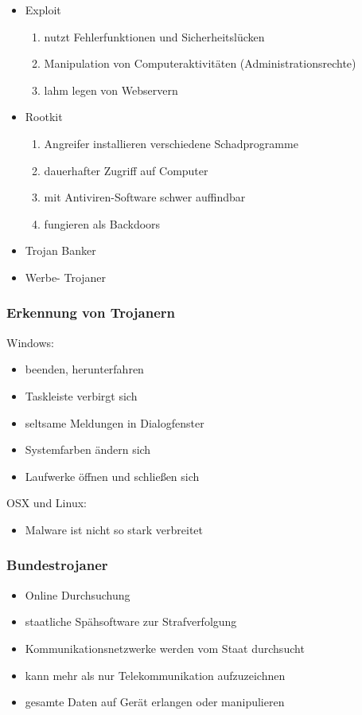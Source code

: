 \documentclass{beamer}
\begin{document}
\begin{frame}
	\begin{itemize}
		\item Exploit
			\begin{enumerate}
				\item nutzt Fehlerfunktionen und Sicherheitslücken
				\item Manipulation von Computeraktivitäten (Administrationsrechte)
				\item lahm legen von Webservern
			\end{enumerate}
		\item Rootkit
			\begin{enumerate}
				\item Angreifer installieren verschiedene Schadprogramme
				\item dauerhafter Zugriff auf Computer
				\item mit Antiviren-Software schwer auffindbar
				\item fungieren als Backdoors
			\end{enumerate}
		\item Trojan Banker
		\item Werbe- Trojaner
	\end{itemize}
\end{frame}

\begin{frame}
	\frametitle{Erkennung von Trojanern}
	Windows:
	\begin{itemize}
		\item beenden, herunterfahren
		\item Taskleiste verbirgt sich
		\item seltsame Meldungen in Dialogfenster
		\item Systemfarben ändern sich
		\item Laufwerke öffnen und schließen sich
	\end{itemize}
	OSX und Linux:
	\begin{itemize}
		\item Malware ist nicht so stark verbreitet
	\end{itemize}
\end{frame}


\begin{frame}
	\frametitle{Bundestrojaner}
	\begin{itemize}
		\item Online Durchsuchung
		\item staatliche Spähsoftware zur Strafverfolgung
		\item Kommunikationsnetzwerke werden vom Staat durchsucht
		\item kann mehr als nur Telekommunikation aufzuzeichnen
		\item gesamte Daten auf Gerät erlangen oder manipulieren
	\end{itemize}
\end{frame}
\end{document}
